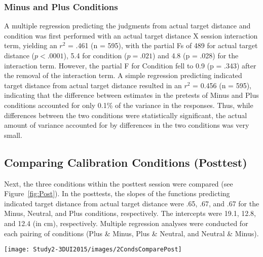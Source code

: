\subsubsection{Minus and Plus Conditions}
A multiple regression predicting the judgments from actual target distance and condition was first performed with an actual target distance X session interaction term, yielding an $r^2$ = .461 (n = 595), with the partial Fs of 489 for actual target distance ($p < .0001$), 5.4 for condition ($p = .021$) and 4.8 (p = .028) for the interaction term. However, the partial F for Condition fell to 0.9 (p = .343) after the removal of the interaction term. A simple regression predicting indicated target distance from actual target distance resulted in an $r^2$ = 0.456 (n = 595), indicating that the difference between estimates in the pretests of Minus and Plus conditions accounted for only 0.1\% of the variance in the responses. Thus, while differences between the two conditions were statistically significant, the actual amount of variance accounted for by differences in the two conditions was very small.

\subsection{Comparing Calibration Conditions (Posttest)}
Next, the three conditions within the posttest session were compared (see Figure~\ref{fig:Post}). In the posttests, the slopes of the functions predicting indicated target distance from actual target distance were .65, .67, and .67 for the Minus, Neutral, and Plus conditions, respectively. The intercepts were 19.1, 12.8, and 12.4 (in cm), respectively. Multiple regression analyses were conducted for each pairing of conditions (Plus \& Minus, Plus \& Neutral, and Neutral \& Minus).

\begin{figure*}[ht]
	\centering
	\texttt{[image: Study2-3DUI2015/images/2CondsComparePost]}
	\vspace{-1em}
	\caption{Reach estimates in (a) Minus and Neutral conditions, (b) Neutral and Plus conditions and (c) Minus and Plus conditions as a function of the actual target distances for the posttest.}
	\label{fig:Post}
\end{figure*}

